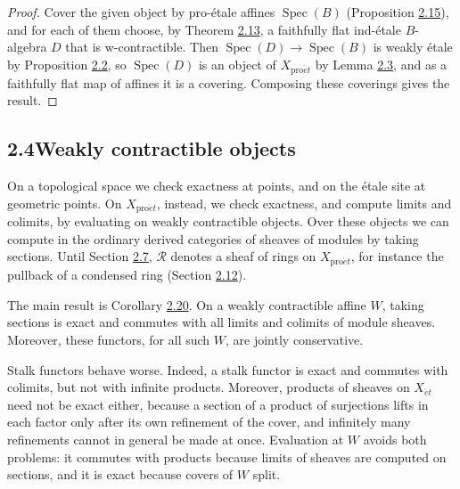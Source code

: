 \documentclass[11pt]{article}
\begin{document}
\begin{proof}[{Proof}]\label{bp52}%
Cover the given object by pro-étale affines \(\operatorname{Spec}(B)\) (Proposition \hyperref[bp46]{2.15}), and for each of them choose, by Theorem \hyperref[bp39]{2.13}, a faithfully flat ind-étale \(B\)-algebra \(D\) that is w-contractible. Then \(\operatorname{Spec}(D)\to\operatorname{Spec}(B)\) is weakly étale by Proposition \hyperref[bp9]{2.2}, so \(\operatorname{Spec}(D)\) is an object of \(X_{\mathrm{pro}\acute{e}t}\) by Lemma \hyperref[bp12]{2.3}, and as a faithfully flat map of affines it is a covering. Composing these coverings gives the result.
\end{proof}


\subsection*{\texorpdfstring{2.4\quad Weakly contractible objects}{2.4 Weakly contractible objects}}
\label{bp53}%
\label{bp54}%
On a topological space we check exactness at points, and on the étale site at geometric points. On \(X_{\mathrm{pro}\acute{e}t}\), instead, we check exactness, and compute limits and colimits, by evaluating on weakly contractible objects. Over these objects we can compute in the ordinary derived categories of sheaves of modules by taking sections. Until Section \hyperref[bp89]{2.7}, \(\mathcal R\) denotes a sheaf of rings on \(X_{\mathrm{pro}\acute{e}t}\), for instance the pullback of a condensed ring (Section \hyperref[bp149]{2.12}).

The main result is Corollary \hyperref[bp59]{2.20}. On a weakly contractible affine \(W\), taking sections is exact and commutes with all limits and colimits of module sheaves. Moreover, these functors, for all such \(W\), are jointly conservative.

Stalk functors behave worse. Indeed, a stalk functor is exact and commutes with colimits, but not with infinite products. Moreover, products of sheaves on \(X_{\acute{e}t}\) need not be exact either, because a section of a product of surjections lifts in each factor only after its own refinement of the cover, and infinitely many refinements cannot in general be made at once. Evaluation at \(W\) avoids both problems: it commutes with products because limits of sheaves are computed on sections, and it is exact because covers of \(W\) split.
\end{document}
